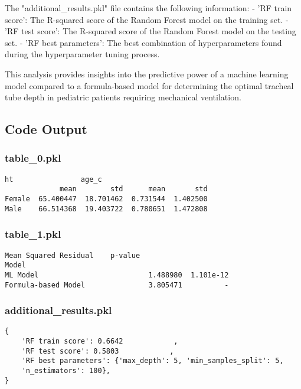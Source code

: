 \documentclass[11pt]{article}
\begin{document}
The "additional\_results.pkl" file contains the following information:
- 'RF train score': The R-squared score of the Random Forest model on the training set.
- 'RF test score': The R-squared score of the Random Forest model on the testing set.
- 'RF best parameters': The best combination of hyperparameters found during the hyperparameter tuning process.

This analysis provides insights into the predictive power of a machine learning model compared to a formula-based model for determining the optimal tracheal tube depth in pediatric patients requiring mechanical ventilation.

\subsection{Code Output}

\subsubsection*{table\_0.pkl}

\begin{Verbatim}[tabsize=4]
               ht                age_c
             mean        std      mean       std
Female  65.400447  18.701462  0.731544  1.402500
Male    66.514368  19.403722  0.780651  1.472808
\end{Verbatim}

\subsubsection*{table\_1.pkl}

\begin{Verbatim}[tabsize=4]
                     Mean Squared Residual    p-value
Model
ML Model                          1.488980  1.101e-12
Formula-based Model               3.805471          -
\end{Verbatim}

\subsubsection*{additional\_results.pkl}

\begin{Verbatim}[tabsize=4]
{
    'RF train score': 0.6642            ,
    'RF test score': 0.5803            ,
    'RF best parameters': {'max_depth': 5, 'min_samples_split': 5,
	'n_estimators': 100},
}
\end{Verbatim}
\end{document}
